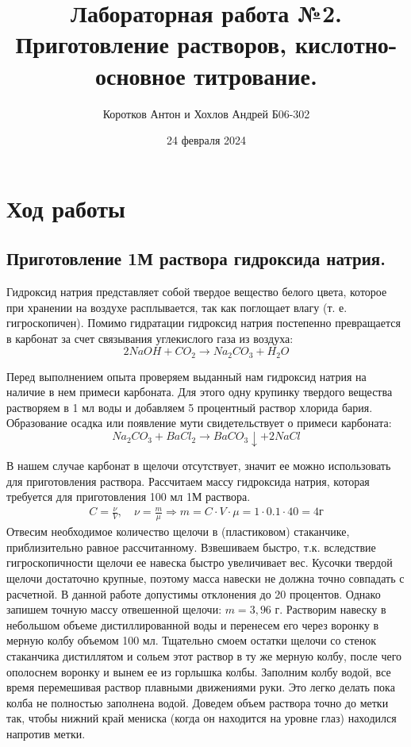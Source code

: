 \documentclass[a4paper, 12pt]{article}
\title{\textbf{Лабораторная работа №2. Приготовление растворов, кислотно-основное титрование.}}
\author{Коротков Антон и Хохлов Андрей Б06-302}
\date{24 февраля 2024}
\begin{document}
	
	\maketitle
	\section{Ход работы}
	\subsection{Приготовление 1М раствора гидроксида натрия.  }
Гидроксид натрия представляет собой твердое вещество белого цвета, которое при хранении на воздухе расплывается, так как поглощает влагу (т. е. гигроскопичен). Помимо гидратации гидроксид натрия постепенно превращается в карбонат за счет связывания углекислого газа из воздуха:
\begin{equation}
    2NaOH + CO_2 \xrightarrow{} Na_2CO_3 + H_2O
\end{equation}

Перед выполнением опыта проверяем выданный нам гидроксид натрия на наличие в нем примеси карбоната. Для этого одну крупинку твердого вещества растворяем в 1 мл воды и добавляем 5 процентный раствор хлорида бария. Образование осадка или появление мути свидетельствует о примеси карбоната:
\begin{equation}
    Na_2CO_3 + BaCl_2 \xrightarrow[]{} BaCO_3\downarrow + 2NaCl
\end{equation}

В нашем случае карбонат в щелочи отсутствует, значит ее можно использовать для приготовления раствора.
Рассчитаем массу гидроксида натрия, которая требуется для приготовления 100 мл 1М раствора.
\begin{align}
    C = \frac{\nu}{V},\quad \nu = \frac{m}{\mu} \Rightarrow m = C \cdot V \cdot \mu =1 \cdot 0.1 \cdot 40 = 4 \text{г}
\end{align}
Отвесим необходимое количество щелочи в (пластиковом) стаканчике, приблизительно равное рассчитанному. Взвешиваем быстро, т.к. вследствие гигроскопичности щелочи ее навеска быстро увеличивает вес. Кусочки твердой щелочи достаточно крупные, поэтому масса навески не должна точно совпадать с расчетной. В данной работе допустимы отклонения до 20 процентов. Однако запишем точную массу отвешенной щелочи: $m = 3,96$ г. Растворим навеску в небольшом объеме дистиллированной воды и перенесем его через воронку в мерную колбу объемом 100 мл. Тщательно смоем остатки щелочи со стенок стаканчика дистиллятом и сольем этот раствор в ту же мерную колбу, после чего ополоснем воронку и вынем ее из горлышка колбы. Заполним колбу водой, все время перемешивая раствор плавными движениями руки. Это легко делать пока колба не полностью заполнена водой. Доведем объем раствора точно до метки так, чтобы нижний край мениска (когда он находится на уровне глаз) находился напротив метки.
\end{document}
